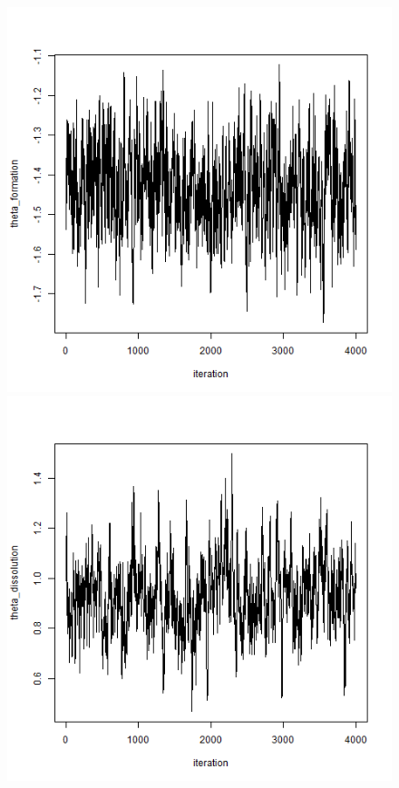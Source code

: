\documentclass[a4paper, 11pt]{report}
\theoremstyle{definition}
\begin{document}
\begin{figure}[h]
    \begin{center}
        \includegraphics[scale=0.395]{pictures/net2seq_chain1_BSTERGM_formation_traceplot.png}
        \includegraphics[scale=0.395]{pictures/net2seq_chain1_BSTERGM_dissolution_traceplot.png} \\

\end{center}
\end{figure}
\end{document}
